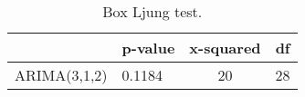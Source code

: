 \begin{table}[ht]
\centering
\caption[Box Ljung test.]{Box Ljung test.} 
\label{tab:chp_ts:arima_res_rbox_l}
\begin{tabular}{llcc}
  \toprule  & p-value & x-squared & df \\ 
  \midrule ARIMA(3,1,2)                    & 0.1184 & 20 & 28 \\ 
   \bottomrule \end{tabular}
\end{table}
